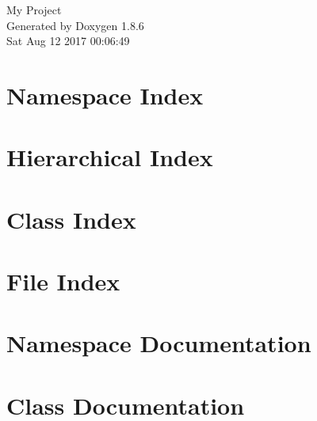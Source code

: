 \documentclass[twoside]{book}
\newcommand{\clearemptydoublepage}{%
  \newpage{\pagestyle{empty}\cleardoublepage}%
}
\begin{document}
\hypersetup{pageanchor=false}
\begin{titlepage}
\vspace*{7cm}
\begin{center}%
{\Large My Project }\\
\vspace*{1cm}
{\large Generated by Doxygen 1.8.6}\\
\vspace*{0.5cm}
{\small Sat Aug 12 2017 00:06:49}\\
\end{center}
\end{titlepage}
\clearemptydoublepage
\tableofcontents
\clearemptydoublepage
{}
\hypersetup{pageanchor=true}

\chapter{Namespace Index}

\chapter{Hierarchical Index}

\chapter{Class Index}

\chapter{File Index}

\chapter{Namespace Documentation}


\chapter{Class Documentation}















\end{document}
